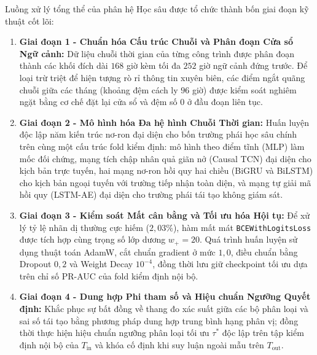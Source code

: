 Luồng xử lý tổng thể của phân hệ Học sâu được tổ chức thành bốn giai đoạn kỹ thuật cốt lõi:
\begin{enumerate}
    \item \textbf{Giai đoạn 1 - Chuẩn hóa Cấu trúc Chuỗi và Phân đoạn Cửa sổ Ngữ cảnh:} Dữ liệu chuỗi thời gian của từng công trình được phân đoạn thành các khối đích dài $168$ giờ kèm tối đa $252$ giờ ngữ cảnh đứng trước. Để loại trừ triệt để hiện tượng rò rỉ thông tin xuyên biên, các điểm ngắt quãng chuỗi giữa các tháng (khoảng đệm cách ly $96$ giờ) được kiểm soát nghiêm ngặt bằng cơ chế đặt lại cửa sổ và đệm số $0$ ở đầu đoạn liên tục.
    \item \textbf{Giai đoạn 2 - Mô hình hóa Đa hệ hình Chuỗi Thời gian:} Huấn luyện độc lập năm kiến trúc nơ-ron đại diện cho bốn trường phái học sâu chính trên cùng một cấu trúc fold kiểm định: mô hình theo điểm tĩnh (MLP) làm mốc đối chứng, mạng tích chập nhân quả giãn nở (Causal TCN) đại diện cho kịch bản trực tuyến, hai mạng nơ-ron hồi quy hai chiều (BiGRU và BiLSTM) cho kịch bản ngoại tuyến với trường tiếp nhận toàn diện, và mạng tự giải mã hồi quy (LSTM-AE) đại diện cho trường phái tái tạo không giám sát.
    \item \textbf{Giai đoạn 3 - Kiểm soát Mất cân bằng và Tối ưu hóa Hội tụ:} Để xử lý tỷ lệ nhãn dị thường cực hiếm ($2{,}03\%$), hàm mất mát \texttt{BCEWithLogitsLoss} được tích hợp cùng trọng số lớp dương $w_{+} = 20$. Quá trình huấn luyện sử dụng thuật toán AdamW, cắt chuẩn gradient ở mức $1{,}0$, điều chuẩn bằng Dropout $0{,}2$ và Weight Decay $10^{-4}$, đồng thời lưu giữ checkpoint tối ưu dựa trên chỉ số PR-AUC của fold kiểm định nội bộ.
    \item \textbf{Giai đoạn 4 - Dung hợp Phi tham số và Hiệu chuẩn Ngưỡng Quyết định:} Khắc phục sự bất đồng về thang đo xác suất giữa các bộ phân loại và sai số tái tạo bằng phương pháp dung hợp trung bình hạng phân vị; đồng thời thực hiện hiệu chuẩn ngưỡng phân loại tối ưu $\tau^*$ độc lập trên tập kiểm định nội bộ của $T_{\text{in}}$ và khóa cố định khi suy luận ngoài mẫu trên $T_{\text{out}}$.
\end{enumerate}


